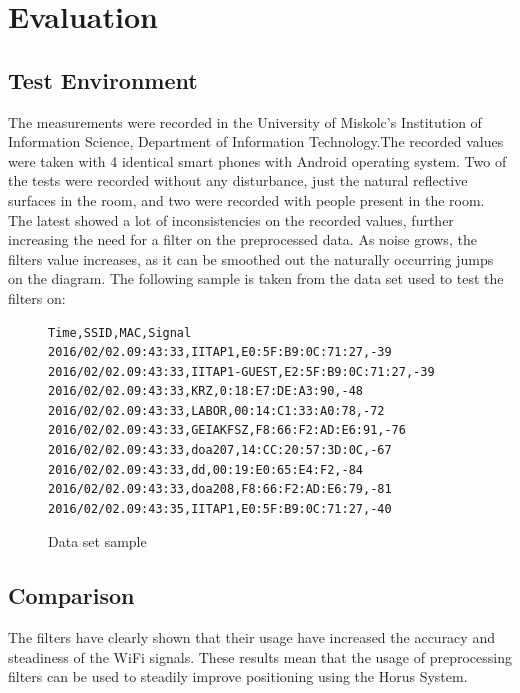 \chapter{Evaluation}
\label{chap:evaluation}
\section{Test Environment}
The measurements were recorded in the University of Miskolc's Institution of Information Science, Department of Information Technology.The recorded values were taken with 4 identical smart phones with Android operating system. Two of the tests were recorded without any disturbance, just the natural reflective surfaces in the room, and two were recorded with people present in the room. The latest showed a lot of inconsistencies on the recorded values, further increasing the need for a filter on the preprocessed data. As noise grows, the filters value increases, as it can be smoothed out the naturally occurring  jumps on the diagram.
The following sample is taken from the data set used to test the filters on:
\begin{figure}[h!]
\begin{verbatim}
Time,SSID,MAC,Signal
2016/02/02.09:43:33,IITAP1,E0:5F:B9:0C:71:27,-39
2016/02/02.09:43:33,IITAP1-GUEST,E2:5F:B9:0C:71:27,-39
2016/02/02.09:43:33,KRZ,0:18:E7:DE:A3:90,-48
2016/02/02.09:43:33,LABOR,00:14:C1:33:A0:78,-72
2016/02/02.09:43:33,GEIAKFSZ,F8:66:F2:AD:E6:91,-76
2016/02/02.09:43:33,doa207,14:CC:20:57:3D:0C,-67
2016/02/02.09:43:33,dd,00:19:E0:65:E4:F2,-84
2016/02/02.09:43:33,doa208,F8:66:F2:AD:E6:79,-81
2016/02/02.09:43:35,IITAP1,E0:5F:B9:0C:71:27,-40

\end{verbatim}
\caption{Data set sample}
\label{fig:Datasample}
\end{figure}

\section{Comparison}
The filters have clearly shown that their usage have increased the accuracy and steadiness of the WiFi signals. These results mean that the usage of preprocessing filters can be used to steadily improve positioning using the Horus System.



